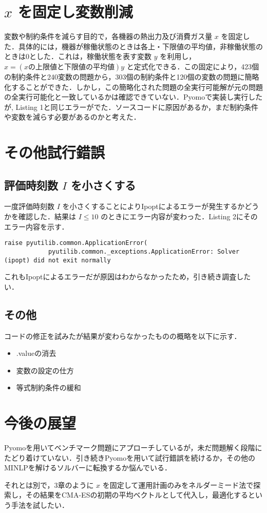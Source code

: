 \documentclass[twocolumn]{jarticle}
\begin{document}
\section{$x$ を固定し変数削減}
    変数や制約条件を減らす目的で，各機器の熱出力及び消費ガス量 $x$ を固定した．具体的には，機器が稼働状態のときは各上・下限値の平均値，非稼働状態のときは0とした．これは，稼働状態を表す変数 $y$ を利用し，$x=(xの上限値と下限値の平均値)y$ と定式化できる．この固定により，423個の制約条件と240変数の問題から，303個の制約条件と120個の変数の問題に簡略化することができた．しかし，この簡略化された問題の全実行可能解が元の問題の全実行可能化と一致しているかは確認できていない．Pyomoで実装し実行したが, Listing 1と同じエラーがでた．ソースコードに原因があるか，まだ制約条件や変数を減らす必要があるのかと考えた．
   
\section{その他試行錯誤}
    \subsection{評価時刻数 $I$ を小さくする}
        一度評価時刻数 $I$ を小さくすることによりIpoptによるエラーが発生するかどうかを確認した．結果は $I\leq10$ のときにエラー内容が変わった．Listing 2にそのエラー内容を示す．
        \begin{lstlisting}[caption = 発生したエラー2]
            raise pyutilib.common.ApplicationError(
            pyutilib.common._exceptions.ApplicationError: Solver (ipopt) did not exit normally
        \end{lstlisting}
        これもIpoptによるエラーだが原因はわからなかったため，引き続き調査したい．
    \subsection{その他}
        コードの修正を試みたが結果が変わらなかったものの概略を以下に示す．
        \begin{itemize}
            \item .valueの消去
            \item 変数の設定の仕方
            \item 等式制約条件の緩和
        \end{itemize}

\section{今後の展望}
    Pyomoを用いてベンチマーク問題にアプローチしているが，未だ問題解く段階にたどり着けていない．引き続きPyomoを用いて試行錯誤を続けるか，その他のMINLPを解けるソルバーに転換するか悩んでいる．
    
    それとは別で，3章のように $x$ を固定して運用計画のみをネルダーミード法で探索し，その結果をCMA-ESの初期の平均ベクトルとして代入し，最適化するという手法を試したい．


\end{document}
